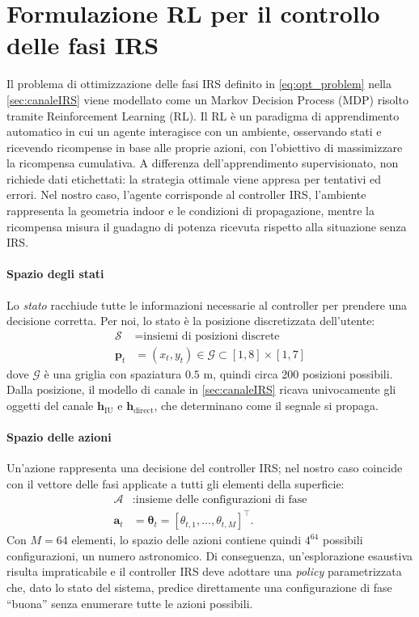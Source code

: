 \documentclass[12pt,a4paper]{report}
\begin{document}
\section{Formulazione RL per il controllo delle fasi IRS}
Il problema di ottimizzazione delle fasi IRS definito in
\eqref{eq:opt_problem} nella \cref{sec:canaleIRS} viene modellato
come un Markov Decision Process (MDP) risolto tramite Reinforcement
Learning (RL). Il RL è un paradigma di apprendimento automatico in
cui un agente interagisce con un ambiente, osservando stati e
ricevendo ricompense in base alle proprie azioni, con l'obiettivo di
massimizzare la ricompensa cumulativa. A differenza
dell'apprendimento supervisionato, non richiede dati etichettati: la
strategia ottimale viene appresa per tentativi ed errori. Nel nostro
caso, l'agente corrisponde al controller IRS, l'ambiente rappresenta
la geometria indoor e le condizioni di propagazione, mentre la
ricompensa misura il guadagno di potenza ricevuta rispetto alla
situazione senza IRS.

\paragraph{Spazio degli stati}
Lo \emph{stato} racchiude tutte le informazioni necessarie al
controller per prendere una decisione corretta. Per noi, lo
stato è la posizione discretizzata dell'utente:
\begin{align}
  \mathcal{S} &= \text{insiemi di posizioni discrete} \\
  \mathbf{p}_t &= (x_t, y_t) \in \mathcal{G} \subset [1,8] \times [1,7]
\end{align}
dove $\mathcal{G}$ è una griglia con spaziatura $0.5$ m, quindi circa
200 posizioni possibili. Dalla posizione, il modello di canale in
\cref{sec:canaleIRS} ricava univocamente gli oggetti del canale
$\mathbf{h}_{\mathrm{IU}}$ e $\mathbf{h}_{\mathrm{direct}}$, che
determinano come il segnale si propaga.

\paragraph{Spazio delle azioni}
Un'azione rappresenta una decisione del controller IRS; nel nostro
caso coincide con il vettore delle fasi applicate a tutti gli
elementi della superficie:
\begin{align}
  \mathcal{A} &: \text{insieme delle configurazioni di fase}\\
  \mathbf{a}_t &= \boldsymbol{\theta}_t =
  [\theta_{t,1}, \dots, \theta_{t,M}]^\top.
\end{align}
Con $M = 64$ elementi, lo spazio delle azioni contiene quindi
$4^{64}$ possibili configurazioni, un numero astronomico.   Di
conseguenza, un'esplorazione esaustiva risulta impraticabile e il
controller IRS deve adottare una \emph{policy} parametrizzata che,
dato lo stato del sistema, predice direttamente una configurazione di
fase “buona” senza enumerare tutte le azioni possibili.
\end{document}
